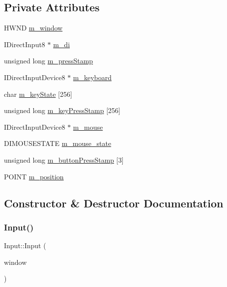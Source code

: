 \subsection*{Private Attributes}
\begin{DoxyCompactItemize}
\item 
H\+W\+ND \hyperlink{class_input_a6485841e7ce6e512ba04a8802481bf42}{m\+\_\+window}
\item 
I\+Direct\+Input8 $\ast$ \hyperlink{class_input_ade5b2cbf3dd9072d6c2c7466097c3679}{m\+\_\+di}
\item 
unsigned long \hyperlink{class_input_a301f123d7ad61e21568a514d08219bf7}{m\+\_\+press\+Stamp}
\item 
I\+Direct\+Input\+Device8 $\ast$ \hyperlink{class_input_a4b5ec5d30c7d36dd1c2032b400223417}{m\+\_\+keyboard}
\item 
char \hyperlink{class_input_a2fe5036aba8044c756ce7d63faa142b5}{m\+\_\+key\+State} \mbox{[}256\mbox{]}
\item 
unsigned long \hyperlink{class_input_ae2bac0249b4c1bf1c984162e642fdf93}{m\+\_\+key\+Press\+Stamp} \mbox{[}256\mbox{]}
\item 
I\+Direct\+Input\+Device8 $\ast$ \hyperlink{class_input_a53463bab2adf6daaed152db1276387dc}{m\+\_\+mouse}
\item 
D\+I\+M\+O\+U\+S\+E\+S\+T\+A\+TE \hyperlink{class_input_a6507d3096421698410d71e6a160a5d16}{m\+\_\+mouse\+\_\+state}
\item 
unsigned long \hyperlink{class_input_a9435776adeb594cd2b48e97aeda88231}{m\+\_\+button\+Press\+Stamp} \mbox{[}3\mbox{]}
\item 
P\+O\+I\+NT \hyperlink{class_input_a974fd68343b833561316619976a90ec1}{m\+\_\+position}
\end{DoxyCompactItemize}


\subsection{Constructor \& Destructor Documentation}
\hypertarget{class_input_ab6dcffe87310e5260061b007d9367d7b}{}\label{class_input_ab6dcffe87310e5260061b007d9367d7b} 
\subsubsection{\texorpdfstring{Input()}{Input()}}
{\footnotesize\ttfamily Input\+::\+Input (\begin{DoxyParamCaption}\item[{H\+W\+ND}]{window }\end{DoxyParamCaption})}

